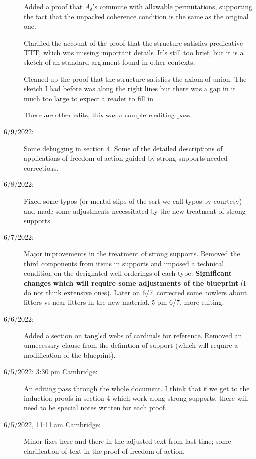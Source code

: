 \documentclass[112pt]{article}
\begin{document}
\begin{description}
Added a proof that $A_\delta$'s commute with allowable permutations, supporting the fact that the unpacked coherence condition is the same as the original one.

Clarified the account of the proof that the structure satisfies predicative TTT, which was missing important details.   It's still too brief, but it is a sketch of an standard argument found in other contexts.

Cleaned up the proof that the structure satisfies the axiom of union.  The sketch I had before was along the right lines but there was a gap in it much too large to expect a reader to fill in.

There are other edits;  this was a complete editing pass.

\item[6/9/2022:]  Some debugging in section 4.  Some of the detailed descriptions of applications of freedom of action guided by strong supports needed corrections.  

\item[6/8/2022:]  Fixed some typos (or mental slips of the sort we call typos by courtesy) and made some adjustments necessitated by the new treatment of strong supports.

\item[6/7/2022:]  Major improvements in the treatment of strong supports.  Removed the third components from items in supports and imposed a technical condition on the designated well-orderings of each type.  {\bf Significant changes which will require some adjustments of the blueprint} (I do not think extensive ones).  Later on 6/7, corrected some howlers about litters vs near-litters in the new material.  5 pm 6/7, more editing.

\item[6/6/2022:]  Added a section on tangled webs of cardinals for reference.  Removed an unnecessary clause from the definition of support (which will require a modification of the blueprint).

\item[6/5/2022:  3:30 pm Cambridge:]  An editing pass through the whole document.  I think that if we get to the induction proofs in section 4 which work along strong supports, there will need to be special notes written for each proof.

\item[6/5/2022, 11:11 am Cambridge:]  Minor fixes here and there in the adjusted text from last time;  some clarification of text in the proof of freedom of action.


\end{description}
\end{document}
